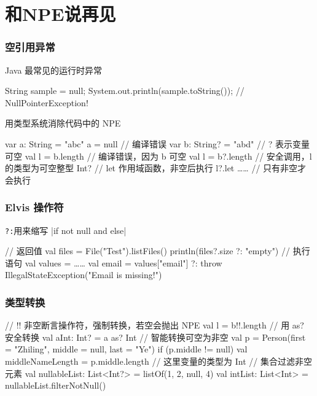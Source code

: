 \section{和NPE说再见}
\begin{frame}[fragile]
    \frametitle{空引用异常}
    \begin{quotebox}[yzlred]
        Java 最常见的运行时异常
    \end{quotebox}
    \begin{javacode}[basicstyle=\scriptsize\ttfamily,emph={[1]sample}]
    String sample = null;
    System.out.println(sample.toString()); // NullPointerException!
    \end{javacode}
    \begin{quotebox}
        \kotlin{} 用类型系统消除代码中的 NPE
    \end{quotebox}
    \begin{kotlincode}[basicstyle=\scriptsize\ttfamily]
    var a: String = "abc"
    a = null // 编译错误
    var b: String? = "abd" // ? 表示变量可空
    val l = b.length // 编译错误，因为 b 可空
    val l = b?.length // 安全调用，l 的类型为可空整型 Int?
    // let 作用域函数，非空后执行
    l?.let { …… // 只有非空才会执行 }
    \end{kotlincode}
\end{frame}

\begin{frame}[fragile]
    \frametitle{Elvis 操作符}
    \begin{quotebox}
        \textcolor{yzlblue}{\texttt{?:}}用来缩写 |if not null and else|
    \end{quotebox}
    \begin{kotlincode}[basicstyle=\scriptsize\ttfamily]
    // 返回值
    val files = File("Test").listFiles()
    println(files?.size ?: "empty")
    // 执行语句
    val values = ……
    val email = values["email"] ?: throw IllegalStateException("Email is missing!")
    \end{kotlincode}
\end{frame}

\begin{frame}[fragile]
    \frametitle{类型转换}
    \begin{kotlincode}[basicstyle=\scriptsize\ttfamily]
    // !! 非空断言操作符，强制转换，若空会抛出 NPE
    val l = b!!.length
    // 用 as? 安全转换
    val aInt: Int? = a as? Int
    // 智能转换可空为非空
    val p = Person(first = "Zhiling", middle = null, last = "Ye")
    if (p.middle != null) {
        val middleNameLength = p.middle.length // 这里变量的类型为 Int
    }
    // 集合过滤非空元素
    val nullableList: List<Int?> = listOf(1, 2, null, 4)
    val intList: List<Int> = nullableList.filterNotNull()
    \end{kotlincode}
\end{frame}

